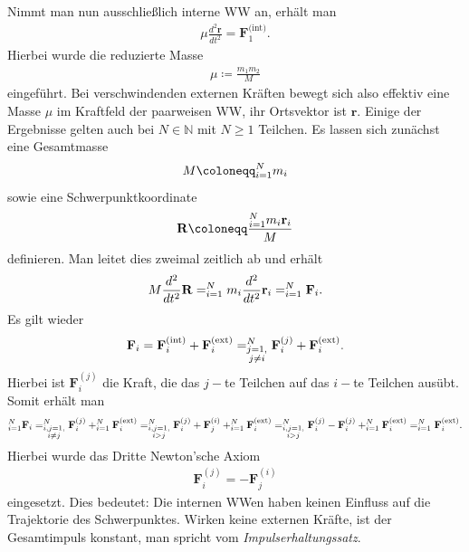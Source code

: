 \documentclass{book}
\let\sum\relax
\DeclareMathOperator*{\sum}{\raisebox{-3.5pt}{\scalebox{2}{\rotatebox{1}{{\bask Σ}}}}}
\begin{document}
%
Nimmt man nun ausschließlich interne WW an, erhält man
%
\begin{eqnarray}
\mu\frac{d^2\mathbf{r}}{dt^2} = \mathbf{F}_1^{\text{(int)}}.
\end{eqnarray}
%
Hierbei wurde die reduzierte Masse
%
\begin{eqnarray}
\mu \coloneqq \frac{m_1m_2}{M}
\end{eqnarray}
%
eingeführt. Bei verschwindenden externen Kräften bewegt sich also effektiv eine Masse $\mu$ im Kraftfeld der paarweisen WW, ihr Ortsvektor ist $\mathbf{r}$. Einige der Ergebnisse gelten auch bei $N\in\mathbb{N}$ mit $N\geq 1$ Teilchen. Es lassen sich zunächst eine Gesamtmasse
%
\begin{eqnarray}
M \coloneqq \sum_{i = 1}^{N}m_i
\end{eqnarray}
%
sowie eine Schwerpunktkoordinate
%
\begin{eqnarray}
\mathbf{R} \coloneqq \frac{\sum_{i = 1}^{N}m_i\mathbf{r}_i}{M}
\end{eqnarray}
%
definieren. Man leitet dies zweimal zeitlich ab und erhält
%
\begin{eqnarray}
M\frac{d^2}{dt^2}\mathbf{R} = \sum_{i = 1}^{N}m_i\frac{d^2}{dt^2}\mathbf{r}_i = \sum_{i = 1}^{N}\mathbf{F}_i.
\end{eqnarray}
%
Es gilt wieder
%
\begin{eqnarray}
\mathbf{F}_i = \mathbf{F}_i^{\text{(int)}} + \mathbf{F}_i^{\text{(ext)}} = \sum_{\substack{j = 1,\\j\not = i}}^{N}\mathbf{F}_i^{(j)} + \mathbf{F}_i^{\text{(ext)}}.
\end{eqnarray}
%
Hierbei ist $\mathbf{F}_i^{(j)}$ die Kraft, die das $j-$te Teilchen auf das $i-$te Teilchen ausübt. Somit erhält man
%
\begin{eqnarray}
\sum_{i = 1}^{N}\mathbf{F}_i = \sum_{\substack{i, j = 1,\\i\not = j}}^{N}\mathbf{F}_i^{(j)} + \sum_{i = 1}^{N}\mathbf{F}_i^{\text{(ext)}} = \sum_{\substack{i, j = 1,\\i>j}}^{N}\mathbf{F}_i^{(j)} + \mathbf{F}_j^{(i)} + \sum_{i = 1}^{N}\mathbf{F}_i^{\text{(ext)}} = \sum_{\substack{i, j = 1,\\i>j}}^{N}\mathbf{F}_i^{(j)} - \mathbf{F}_i^{(j)} + \sum_{i = 1}^{N}\mathbf{F}_i^{\text{(ext)}} = \sum_{i = 1}^{N}\mathbf{F}_i^{\text{(ext)}}.
\end{eqnarray}
%
Hierbei wurde das Dritte Newton'sche Axiom
%
\begin{eqnarray}
\mathbf{F}_i^{(j)} = -\mathbf{F}_j^{(i)}
\end{eqnarray}
%
eingesetzt. Dies bedeutet: Die internen WWen haben keinen Einfluss auf die Trajektorie des Schwerpunktes. Wirken keine externen Kräfte, ist der Gesamtimpuls konstant, man spricht vom \textit{Impulserhaltungssatz}.
\end{document}
